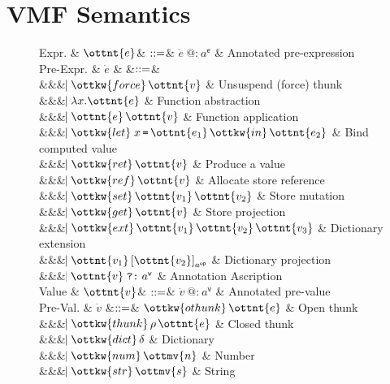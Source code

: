 \section{VMF Semantics}

\begin{figure}
\begin{grammar}
  Expr.     & $\ottnt{e}$& $\mathrel{::=}$& $ \dot{e} ~\texttt{@:}~ a^\textsf{e} $ & Annotated pre-expression
  \\
  Pre-Expr. & $\dot{e}$ & 
  &$\mathrel{::=}$&
  \\ &&& $\bnfaltbrk \ottkw{force} \, \ottnt{v}$ & Unsuspend (force) thunk
  \\ &&& $\bnfaltbrk  \lambda  x .  \ottnt{e} $ & Function abstraction
  \\ &&& $\bnfaltbrk \ottnt{e} \, \ottnt{v}$ & Function application
  \\ &&& $\bnfaltbrk  \ottkw{let} \; x \,{\texttt{=} }\, \ottnt{e_{{\mathrm{1}}}} \, \ottkw{in} \, \ottnt{e_{{\mathrm{2}}}} $ & Bind computed value
  \\ &&& $\bnfaltbrk \ottkw{ret} \, \ottnt{v}$ & Produce a value
  \\ &&& $\bnfaltbrk \ottkw{ref} \, \ottnt{v}$ & Allocate store reference
  \\ &&& $\bnfaltbrk \ottkw{set} \, \ottnt{v_{{\mathrm{1}}}} \, \ottnt{v_{{\mathrm{2}}}}$ & Store mutation
  \\ &&& $\bnfaltbrk \ottkw{get} \, \ottnt{v}$ & Store projection
  \\ &&& $\bnfaltbrk \ottkw{ext} \, \ottnt{v_{{\mathrm{1}}}} \, \ottnt{v_{{\mathrm{2}}}} \, \ottnt{v_{{\mathrm{3}}}}$ & Dictionary extension
  \\ &&& $\bnfaltbrk  \ottnt{v_{{\mathrm{1}}}} \left[  \ottnt{v_{{\mathrm{2}}}}  \right]_{ a^{\textsf{op} } } $ & Dictionary projection
  \\ &&& $\bnfaltbrk \ottnt{v}  \mathrel{ \texttt{?:} }  a^\textsf{v}$ & Annotation Ascription
  \\[2px]
  Value    & $\ottnt{v}$& $\mathrel{::=}$& $ \dot{v} ~\texttt{@:}~ a^\textsf{v} $ & Annotated pre-value
  \\
  Pre-Val. & $\dot{v}$ 
  &$\mathrel{::=}$&        $\ottkw{othunk} \, \ottnt{e}$    & Open thunk
  \\ &&& $\bnfaltbrk \ottkw{thunk} \, \rho \, \ottnt{e}$ & Closed thunk
  \\ &&& $\bnfaltbrk \ottkw{dict} \, \delta$  & Dictionary
  \\ &&& $\bnfaltbrk \ottkw{num} \, \ottmv{n}$ & Number
  \\ &&& $\bnfaltbrk \ottkw{str} \, \ottmv{s}$ & String

\end{grammar}
\end{figure}
